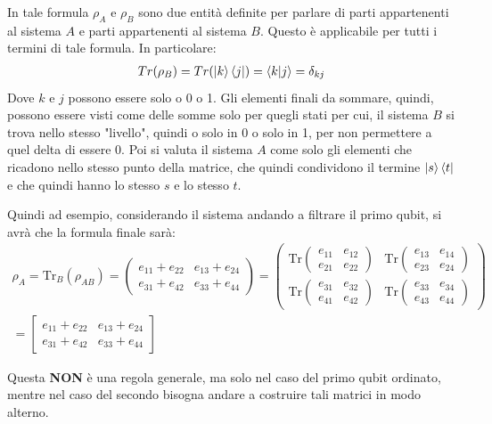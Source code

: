 \begin{info}
In tale formula \(\rho_A\) e \(\rho_B\) sono due entità definite per parlare di parti appartenenti al sistema \(A\) e parti appartenenti al sistema \(B\). Questo è applicabile per tutti i termini di tale formula. In particolare:
\begin{gather*}
Tr(\rho_B) = Tr(\ket{k}\bra{j}) = \braket{k | j} = \delta_{kj}
\end{gather*}
Dove \(k\) e \(j\) possono essere solo o 0 o 1.
Gli elementi finali da sommare, quindi, possono essere visti come delle somme solo per quegli stati per cui, il sistema \(B\) si trova nello stesso "livello", quindi o solo in 0 o solo in 1, per non permettere a quel delta di essere 0. Poi si valuta il sistema \(A\) come solo gli elementi che ricadono nello stesso punto della matrice, che quindi condividono il termine \(\ket{s}\bra{t}\) e che quindi hanno lo stesso \(s\) e lo stesso \(t\).

Quindi ad esempio, considerando il sistema andando a filtrare il primo qubit, si avrà che la formula finale sarà:
\begin{gather*}
\rho_A = \mathrm{Tr}_B(\rho_{AB}) =
\left(\begin{smallmatrix}
e_{11}+e_{22} & e_{13}+e_{24}\\
e_{31}+e_{42} & e_{33}+e_{44}
\end{smallmatrix}\right)
=
\left(\begin{smallmatrix}
\mathrm{Tr}\left(\begin{smallmatrix} e_{11} & e_{12}\\ e_{21} & e_{22} \end{smallmatrix}\right) &
\mathrm{Tr}\left(\begin{smallmatrix} e_{13} & e_{14}\\ e_{23} & e_{24} \end{smallmatrix}\right)\\[2ex]
\mathrm{Tr}\left(\begin{smallmatrix} e_{31} & e_{32}\\ e_{41} & e_{42} \end{smallmatrix}\right) &
\mathrm{Tr}\left(\begin{smallmatrix} e_{33} & e_{34}\\ e_{43} & e_{44} \end{smallmatrix}\right)
\end{smallmatrix}\right)\\
= 
\left[\begin{smallmatrix}
e_{11} + e_{22} & e_{13} + e_{24}\\
e_{31} + e_{42} & e_{33} + e_{44}       
\end{smallmatrix}\right]
\end{gather*}

Questa \textbf{NON} è una regola generale, ma solo nel caso del primo qubit ordinato, mentre nel caso del secondo bisogna andare a costruire tali matrici in modo alterno.
\end{info}


